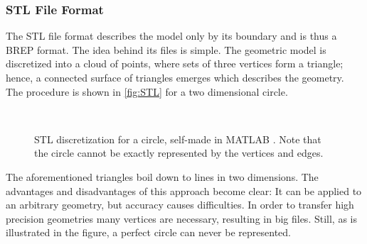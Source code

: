 \subsubsection{\acs{STL} File Format} \label{subsub:STL}
The \acf{STL} file format describes the model only by its boundary and is thus a \ac{BREP} format. The idea behind its files is simple. The geometric model is discretized into a cloud of points, where sets of three vertices form a triangle; hence, a connected surface of triangles emerges which describes the geometry. The procedure is shown in \autoref{fig:STL} for a two dimensional circle.  
\begin{figure}
\centering
   \\
   \caption{\ac{STL} discretization for a circle, self-made in MATLAB \cite{MATLAB}. Note that the circle cannot be exactly represented by the vertices and edges.}
   \label{fig:STL}
\end{figure}
The aforementioned triangles boil down to lines in two dimensions. The advantages and disadvantages of this approach become clear: It can be applied to an arbitrary geometry, but accuracy causes difficulties. In order to transfer high precision geometries many vertices are necessary, resulting in big files. Still, as is illustrated in the figure, a perfect circle can never be represented. 

